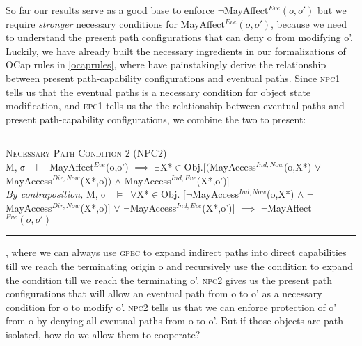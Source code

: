 \documentclass[a4paper,11pt, twoside,twocolumn]{article}
\newenvironment{logic}[1][]
{\begin{flushleft} \small }
{\end{flushleft}}
\newcommand{\loin}{$\in$}
\newcommand{\loforall}{$\forall$}
\newcommand{\loexists}{$\exists$}
\newcommand{\loand}{$\land$}
\newcommand{\loor} {$\lor$}
\newcommand{\loimplies}{$\implies$}
\newcommand{\losigma}{$\upsigma$}
\newcommand{\loturns} {$\vDash$}
\newcommand{\loneg}{$\boldsymbol \neg$}
\newcommand{\ablock} {\null\qquad}
\begin{document}
So far our results serve as a good base to enforce \loneg MayAffect$^{Eve}(o,o')$ but we require \textit{stronger} necessary conditions for MayAffect$^{Eve}(o,o')$, because we need to understand the present path configurations that can deny o from modifying o'. Luckily, we have already built the necessary ingredients in our formalizations of OCap rules in \ref{ocaprules}, where have painstakingly derive the relationship between present path-capability configurations and eventual paths. Since \textsc{npc1} tells us that the eventual paths is a necessary condition for object state modification, and \textsc{epc1} tells us the the relationship between eventual paths and present path-capability configurations, we combine the two to present: 

\begin{logic}
\hrule\null
\textsc{\normalsize *Necessary Path Condition 2 (NPC2)}\\
M,\losigma\ \loturns\ MayAffect$^{Eve}$(o,o')\linebreak
\ablock \loimplies\linebreak
\ablock \loexists X*\loin Obj.$[($MayAccess$^{Ind,Now}$(o,X*) \loor \linebreak
\ablock \ablock \ablock \quad MayAccess$^{Dir,Now}$(X*,o)$)$\linebreak
\ablock \ablock \ablock \ablock \loand \linebreak
\ablock \ablock \ablock \quad MayAccess$^{Ind,Eve}$(X*,o')$]$
\linebreak \\
\textit{By contraposition,}\linebreak
M,\losigma\ \loturns\ 
\loforall X*\loin Obj. $[$\loneg MayAccess$^{Ind,Now}$(o,X*) \loand \linebreak
\ablock \ablock \ablock \ablock \loneg MayAccess$^{Dir,Now}$(X*,o)$]$\linebreak
\ablock \ablock \ablock \ablock \loor \linebreak
\ablock \ablock \ablock \ablock \loneg MayAccess$^{Ind,Eve}$(X*,o')$]$\linebreak
\ablock \loimplies \linebreak
	\ablock\loneg MayAffect$^{Eve}(o,o')$\linebreak
\hrule
\end{logic}
, where we can always use \textsc{gpec} to expand indirect paths into direct capabilities till we reach the terminating origin o and recursively use the condition to expand the condition till we reach the terminating o'. \textsc{npc2} gives us the present path configurations that will allow an eventual path from o to o' as a necessary condition for o to modify o'. \textsc{npc2} tells us that we can enforce protection of o' from o by denying all eventual paths from o to o'. But if those objects are path-isolated, how do we allow them to cooperate? 
\end{document}

